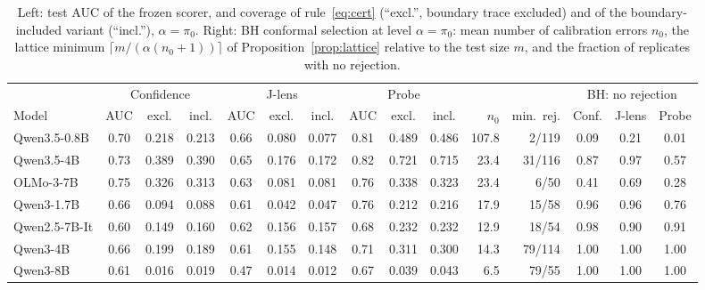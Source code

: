 \begin{table}[H]
\centering\small
\caption{Left: test AUC of the frozen scorer, and coverage of rule~\eqref{eq:cert} (``excl.'', boundary trace excluded) and of the boundary-included variant (``incl.''), $\alpha=\pi_0$. Right: BH conformal selection at level $\alpha=\pi_0$: mean number of calibration errors $n_0$, the lattice minimum $\lceil m/(\alpha(n_0+1))\rceil$ of Proposition~\ref{prop:lattice} relative to the test size $m$, and the fraction of replicates with no rejection.}
\label{tab:bh}
\setlength{\tabcolsep}{2.6pt}
\begin{tabular}{l ccc ccc ccc rr ccc}
\toprule
 & \multicolumn{3}{c}{Confidence} & \multicolumn{3}{c}{J-lens} & \multicolumn{3}{c}{Probe} & & & \multicolumn{3}{c}{BH: no rejection} \\
\cmidrule(lr){2-4}\cmidrule(lr){5-7}\cmidrule(lr){8-10}\cmidrule(lr){13-15}
Model & AUC & excl. & incl. & AUC & excl. & incl. & AUC & excl. & incl. & $n_0$ & min.\ rej. & Conf. & J-lens & Probe \\
\midrule
Qwen3.5-0.8B & 0.70 & 0.218 & 0.213 & 0.66 & 0.080 & 0.077 & 0.81 & 0.489 & 0.486 & 107.8 & 2/119 & 0.09 & 0.21 & 0.01 \\
Qwen3.5-4B & 0.73 & 0.389 & 0.390 & 0.65 & 0.176 & 0.172 & 0.82 & 0.721 & 0.715 & 23.4 & 31/116 & 0.87 & 0.97 & 0.57 \\
OLMo-3-7B & 0.75 & 0.326 & 0.313 & 0.63 & 0.081 & 0.081 & 0.76 & 0.338 & 0.323 & 23.4 & 6/50 & 0.41 & 0.69 & 0.28 \\
Qwen3-1.7B & 0.66 & 0.094 & 0.088 & 0.61 & 0.042 & 0.047 & 0.76 & 0.212 & 0.216 & 17.9 & 15/58 & 0.96 & 0.96 & 0.76 \\
Qwen2.5-7B-It & 0.60 & 0.149 & 0.160 & 0.62 & 0.156 & 0.157 & 0.68 & 0.232 & 0.232 & 12.9 & 18/54 & 0.98 & 0.90 & 0.91 \\
Qwen3-4B & 0.66 & 0.199 & 0.189 & 0.61 & 0.155 & 0.148 & 0.71 & 0.311 & 0.300 & 14.3 & 79/114 & 1.00 & 1.00 & 1.00 \\
Qwen3-8B & 0.61 & 0.016 & 0.019 & 0.47 & 0.014 & 0.012 & 0.67 & 0.039 & 0.043 & 6.5 & 79/55 & 1.00 & 1.00 & 1.00 \\
\bottomrule
\end{tabular}
\end{table}
